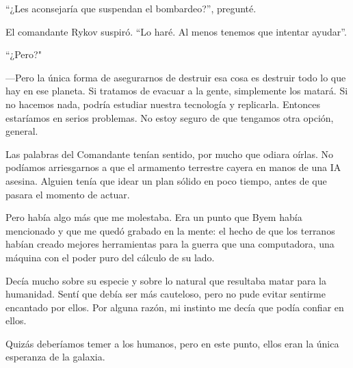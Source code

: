 “¿Les aconsejaría que suspendan el bombardeo?”, pregunté.

El comandante Rykov suspiró. “Lo haré. Al menos tenemos que intentar ayudar”.

``¿Pero?"

—Pero la única forma de asegurarnos de destruir esa cosa es destruir todo lo que hay en ese planeta. Si tratamos de evacuar a la gente, simplemente los matará. Si no hacemos nada, podría estudiar nuestra tecnología y replicarla. Entonces estaríamos en serios problemas. No estoy seguro de que tengamos otra opción, general.

Las palabras del Comandante tenían sentido, por mucho que odiara oírlas. No podíamos arriesgarnos a que el armamento terrestre cayera en manos de una IA asesina. Alguien tenía que idear un plan sólido en poco tiempo, antes de que pasara el momento de actuar.

Pero había algo más que me molestaba. Era un punto que Byem había mencionado y que me quedó grabado en la mente: el hecho de que los terranos habían creado mejores herramientas para la guerra que una computadora, una máquina con el poder puro del cálculo de su lado.

Decía mucho sobre su especie y sobre lo natural que resultaba matar para la humanidad. Sentí que debía ser más cauteloso, pero no pude evitar sentirme encantado por ellos. Por alguna razón, mi instinto me decía que podía confiar en ellos.

Quizás deberíamos temer a los humanos, pero en este punto, ellos eran la única esperanza de la galaxia.